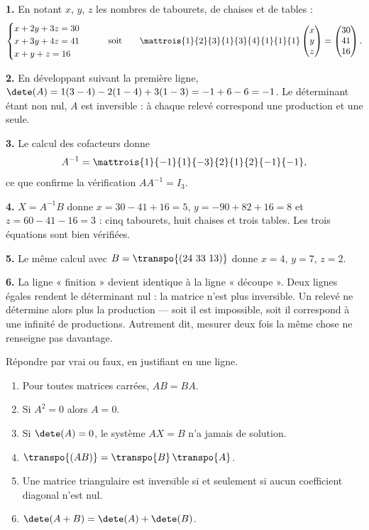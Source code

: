 \begin{corrige}
\textbf{1.} En notant $x$, $y$, $z$ les nombres de tabourets, de chaises et de
tables :
\[
  \begin{cases} x+2y+3z = 30 \\ x+3y+4z = 41 \\ x+y+z = 16 \end{cases}
  \qquad\text{soit}\qquad
  \mattrois{1}{2}{3}{1}{3}{4}{1}{1}{1}
  \begin{pmatrix} x \\ y \\ z \end{pmatrix}
  = \begin{pmatrix} 30 \\ 41 \\ 16 \end{pmatrix}.
\]

\textbf{2.} En développant suivant la première ligne,
$\dete(A) = 1(3-4)-2(1-4)+3(1-3) = -1+6-6 = -1$. Le déterminant étant non
nul, $A$ est inversible : à chaque relevé correspond une production et une
seule.

\textbf{3.} Le calcul des cofacteurs donne
\[
  A^{-1} = \mattrois{1}{-1}{1}{-3}{2}{1}{2}{-1}{-1},
\]
ce que confirme la vérification $AA^{-1} = I_{3}$.

\textbf{4.} $X = A^{-1}B$ donne
$x = 30-41+16 = 5$, $y = -90+82+16 = 8$ et $z = 60-41-16 = 3$ : cinq
tabourets, huit chaises et trois tables. Les trois équations sont bien
vérifiées.

\textbf{5.} Le même calcul avec $B = \transpo{(24\ 33\ 13)}$ donne
$x = 4$, $y = 7$, $z = 2$.

\textbf{6.} La ligne « finition » devient identique à la ligne « découpe ».
Deux lignes égales rendent le déterminant nul : la matrice n'est plus
inversible. Un relevé ne détermine alors plus la production — soit il est
impossible, soit il correspond à une infinité de productions. Autrement dit,
mesurer deux fois la même chose ne renseigne pas davantage.
\end{corrige}

\begin{jemeteste}
Répondre par vrai ou faux, en justifiant en une ligne.

\begin{enumerate}[label=\textbf{\arabic*.}, leftmargin=*, itemsep=0.28em]
  \item Pour toutes matrices carrées, $AB = BA$.
  \item Si $A^{2} = 0$ alors $A = 0$.
  \item Si $\dete(A) = 0$, le système $AX = B$ n'a jamais de solution.
  \item $\transpo{(AB)} = \transpo{B}\,\transpo{A}$.
  \item Une matrice triangulaire est inversible si et seulement si aucun
        coefficient diagonal n'est nul.
  \item $\dete(A+B) = \dete(A)+\dete(B)$.
\end{enumerate}
\end{jemeteste}

